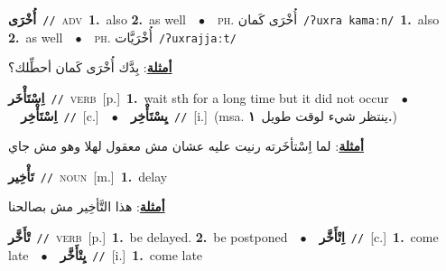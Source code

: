 \documentclass[10pt,a4paper,twoside]{article} %
\begin{document}
\begin{multicols}{2}
{\setlength\topsep{0pt}\textbf{\foreignlanguage{arabic}{أُخْرَى}}\ {\color{gray}\texttt{//}\color{black}}\ \textsc{adv}\ \textbf{1.}~also  \textbf{2.}~as well\ \ $\bullet$\ \ \textsc{ph.} \color{gray} \foreignlanguage{arabic}{أُخْرَى كَمان}\color{black}\ {\color{gray}\texttt{/{\sffamily ʔuxra kamaːn}/}\color{black}}\ \textbf{1.}~also  \textbf{2.}~as well\ \ $\bullet$\ \ \textsc{ph.} \color{gray} \foreignlanguage{arabic}{أُخْرَيَّات}\color{black}\ {\color{gray}\texttt{/{\sffamily ʔuxrajjaːt}/}\color{black}}\  \begin{flushright}\color{gray}\foreignlanguage{arabic}{\textbf{\underline{\foreignlanguage{arabic}{أمثلة}}}: بِدَّك أُخْرَى كَمان أحطِّلك؟}\end{flushright}\color{black}} \vspace{2mm}

{\setlength\topsep{0pt}\textbf{\foreignlanguage{arabic}{اِسْتَأْخَر}}\ {\color{gray}\texttt{//}\color{black}}\ \textsc{verb}\ [p.]\ \textbf{1.}~wait sth for a long time but it did not occur\ \ $\bullet$\ \ \setlength\topsep{0pt}\textbf{\foreignlanguage{arabic}{اِسْتَأْخِر}}\ {\color{gray}\texttt{//}\color{black}}\ [c.]\ \ $\bullet$\ \ \setlength\topsep{0pt}\textbf{\foreignlanguage{arabic}{يِسْتَأْخِر}}\ {\color{gray}\texttt{//}\color{black}}\ [i.]\ \color{gray}(msa. \foreignlanguage{arabic}{ينتظر شيء لوقت طويل}~\foreignlanguage{arabic}{\textbf{١.}})\color{black}\  \begin{flushright}\color{gray}\foreignlanguage{arabic}{\textbf{\underline{\foreignlanguage{arabic}{أمثلة}}}: لما اِسْتأخَرته رنيت عليه عشان مش معقول لهلا وهو مش جاي}\end{flushright}\color{black}} \vspace{2mm}

{\setlength\topsep{0pt}\textbf{\foreignlanguage{arabic}{تَأْخِير}}\ {\color{gray}\texttt{//}\color{black}}\ \textsc{noun}\ [m.]\ \textbf{1.}~delay\  \begin{flushright}\color{gray}\foreignlanguage{arabic}{\textbf{\underline{\foreignlanguage{arabic}{أمثلة}}}: هذا التَّأخِير مش بصالحنا}\end{flushright}\color{black}} \vspace{2mm}

{\setlength\topsep{0pt}\textbf{\foreignlanguage{arabic}{تْأَخَّر}}\ {\color{gray}\texttt{//}\color{black}}\ \textsc{verb}\ [p.]\ \textbf{1.}~be delayed.  \textbf{2.}~be postponed\ \ $\bullet$\ \ \setlength\topsep{0pt}\textbf{\foreignlanguage{arabic}{اِتْأَخَّر}}\ {\color{gray}\texttt{//}\color{black}}\ [c.]\ \textbf{1.}~come late\ \ $\bullet$\ \ \setlength\topsep{0pt}\textbf{\foreignlanguage{arabic}{يِتْأَخَّر}}\ {\color{gray}\texttt{//}\color{black}}\ [i.]\ \textbf{1.}~come late\ } \vspace{2mm}


\end{multicols}
\end{document}
